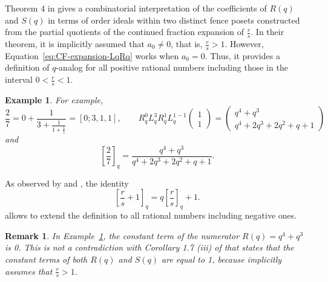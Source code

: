 \documentclass[a4paper,12pt]{amsart}
\newtheorem{example}[definition]{Example}
\newtheorem{remark}[definition]{Remark}
\newcommand{\0}{\mathtt{0}}
\newcommand{\1}{\mathtt{1}}
\newcommand{\2}{\mathtt{2}}
\newcommand{\3}{\mathtt{3}}
\begin{document}
Theorem 4 in \cite{MR4073883} gives a combinatorial
interpretation of the coefficients of $R(q)$ and $S(q)$
in terms of order ideals within two distinct fence posets
constructed from the partial quotients of the continued fraction expansion of
$\frac{r}{s}$.
In their theorem, it is implicitly assumed
that $a_0\neq 0$, that is, $\frac{r}{s}>1$.
However, Equation~\eqref{eq:CF-expansion-LqRq} works when $a_0=0$.
Thus, it provides a definition of $q$-analog for all
positive rational numbers including those in the interval $0<\frac{r}{s}<1$.
\begin{example}\label{ex:2-sur-7}
For example,
\[
    \frac{2}{7}
    = 0
    + \frac{1}{3
    + \frac{1}{1
    + \frac{1}{1
    }}}
    = [0;3,1,1],
    \qquad
        R_q^{0}L_q^{3}R_q^{1}L_q^{1-1}
         \left(\begin{array}{c} 1 \\ 1 \end{array}\right)
        =
    \left(\begin{array}{c} {q^{4} + q^{3}} \\ {q^4+2q^3+2q^2+q+1} \end{array}\right)
\]
and
\[
    \left[\frac{2}{7}\right]_q
    =
    \frac{q^4+q^3}{q^4+2q^3+2q^2+q+1}.
\]
\end{example}

As observed by \cite{MorierGenoud2019} and \cite{MR4073883},
the identity
\begin{equation}\label{eq:identity-q-rationals}
    \left[\frac{r}{s}+1\right]_q
    = q\left[\frac{r}{s}\right]_q + 1.
\end{equation}
allows to extend the definition to all rational numbers including negative ones.




\begin{remark}
In Example~\ref{ex:2-sur-7}, the constant term of the numerator $R(q)=q^4+q^3$ is 0.
This is not a contradiction with Corollary 1.7 (iii) of \cite{MR4073883}
that states that the constant terms of both $R(q)$ and $S(q)$ are equal to 1,
because \cite{MR4073883} implicitly assumes that $\frac{r}{s}>1$.
\end{remark}

%
%
%
%
%
%
%
%
%

%
%
%
%
\end{document}
